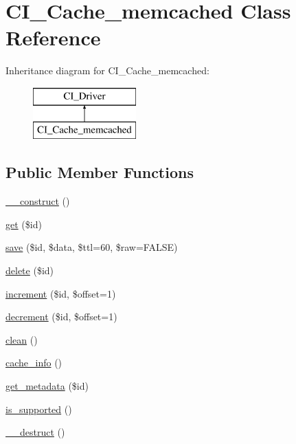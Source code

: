 \hypertarget{class_c_i___cache__memcached}{}\section{C\+I\+\_\+\+Cache\+\_\+memcached Class Reference}
\label{class_c_i___cache__memcached}
Inheritance diagram for C\+I\+\_\+\+Cache\+\_\+memcached\+:\begin{figure}[H]
\begin{center}
\leavevmode
\includegraphics[height=2.000000cm]{class_c_i___cache__memcached}
\end{center}
\end{figure}
\subsection*{Public Member Functions}
\begin{DoxyCompactItemize}
\item 
\mbox{\hyperlink{class_c_i___cache__memcached_a0e640c05dd6df6ec5172cc8853d65f22}{\+\_\+\+\_\+construct}} ()
\item 
\mbox{\hyperlink{class_c_i___cache__memcached_a74f9325b432c7a29d1a5e6a5e517014e}{get}} (\$id)
\item 
\mbox{\hyperlink{class_c_i___cache__memcached_a3d6dc351e0490a5fdf10f5db9ec18336}{save}} (\$id, \$data, \$ttl=60, \$raw=F\+A\+L\+SE)
\item 
\mbox{\hyperlink{class_c_i___cache__memcached_a4c20516e1a73eba4c623b48cba7f2864}{delete}} (\$id)
\item 
\mbox{\hyperlink{class_c_i___cache__memcached_a97114b45ad17ad8193a3740c3d79d550}{increment}} (\$id, \$offset=1)
\item 
\mbox{\hyperlink{class_c_i___cache__memcached_a3e4af6885f208645a3dbe071c45228bd}{decrement}} (\$id, \$offset=1)
\item 
\mbox{\hyperlink{class_c_i___cache__memcached_a05e8d2bb12401231b7593d807be0ecc8}{clean}} ()
\item 
\mbox{\hyperlink{class_c_i___cache__memcached_a3153f976fda08ab1c88b208b20f05ef7}{cache\+\_\+info}} ()
\item 
\mbox{\hyperlink{class_c_i___cache__memcached_ae4b3f44055784e4f6b07a942528fcabb}{get\+\_\+metadata}} (\$id)
\item 
\mbox{\hyperlink{class_c_i___cache__memcached_a4833151ba93e4e6370f5849eaaab832a}{is\+\_\+supported}} ()
\item 
\mbox{\hyperlink{class_c_i___cache__memcached_a726fd00d09d51bd2b42a731e831d2262}{\+\_\+\+\_\+destruct}} ()
\end{DoxyCompactItemize}
